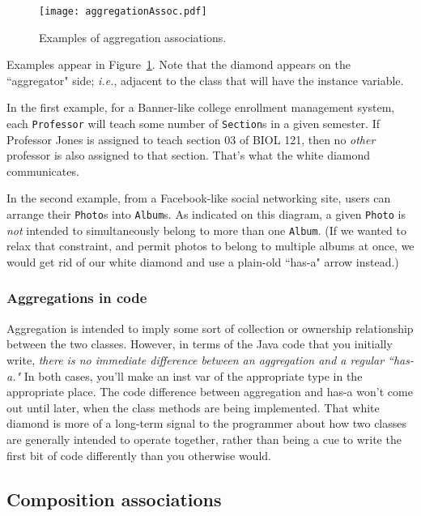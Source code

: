 \begin{figure}[ht]
\centering
\texttt{[image: aggregationAssoc.pdf]}   %
\caption{Examples of aggregation associations.}
\label{fig:aggregationAssoc}
\end{figure}

Examples appear in Figure~\ref{fig:aggregationAssoc}. Note that the diamond
appears on the ``aggregator" side; \textit{i.e.}, adjacent to the class that
will have the instance variable.

In the first example, for a Banner-like college enrollment management system,
each \texttt{Professor} will teach some number of \texttt{Section}s in a given
semester. If Professor Jones is assigned to teach section 03 of BIOL 121, then
no \textit{other} professor is also assigned to that section. That's what the
white diamond communicates.

In the second example, from a Facebook-like social networking site, users can
arrange their \texttt{Photo}s into \texttt{Album}s. As indicated on this
diagram, a given \texttt{Photo} is \textit{not} intended to simultaneously
belong to more than one \texttt{Album}. (If we wanted to relax that
constraint, and permit photos to belong to multiple albums at once, we would
get rid of our white diamond and use a plain-old ``has-a" arrow instead.)

\subsubsection{Aggregations in code}

Aggregation is intended to imply some sort of collection or ownership
relationship between the two classes. However, in terms of the Java code that
you initially write, \textit{there is no immediate difference between an
aggregation and a regular ``has-a."} In both cases, you'll make an inst var of
the appropriate type in the appropriate place. The code difference between
aggregation and has-a won't come out until later, when the class methods are
being implemented. That white diamond is more of a long-term signal to the
programmer about how two classes are generally intended to operate together,
rather than being a cue to write the first bit of code differently than you
otherwise would.

\subsection{Composition associations}

